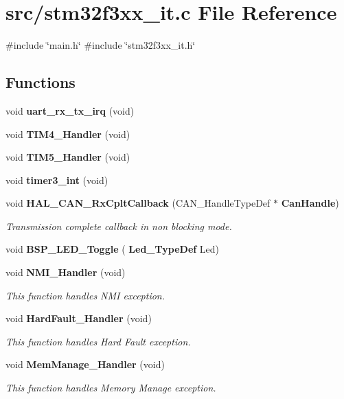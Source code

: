 \section{src/stm32f3xx\+\_\+it.c File Reference}
\label{stm32f3xx__it_8c}
{\ttfamily \#include \char`\"{}main.\+h\char`\"{}}\newline
{\ttfamily \#include \char`\"{}stm32f3xx\+\_\+it.\+h\char`\"{}}\newline
\subsection*{Functions}
\begin{DoxyCompactItemize}
\item 
void \textbf{ uart\+\_\+rx\+\_\+tx\+\_\+irq} (void)
\item 
void \textbf{ T\+I\+M4\+\_\+\+Handler} (void)
\item 
void \textbf{ T\+I\+M5\+\_\+\+Handler} (void)
\item 
void \textbf{ timer3\+\_\+int} (void)
\item 
void \textbf{ H\+A\+L\+\_\+\+C\+A\+N\+\_\+\+Rx\+Cplt\+Callback} (C\+A\+N\+\_\+\+Handle\+Type\+Def $\ast$\textbf{ Can\+Handle})
\begin{DoxyCompactList}\small\item\em Transmission complete callback in non blocking mode. \end{DoxyCompactList}\item 
void \textbf{ B\+S\+P\+\_\+\+L\+E\+D\+\_\+\+Toggle} (\textbf{ Led\+\_\+\+Type\+Def} Led)
\item 
void \textbf{ N\+M\+I\+\_\+\+Handler} (void)
\begin{DoxyCompactList}\small\item\em This function handles N\+MI exception. \end{DoxyCompactList}\item 
void \textbf{ Hard\+Fault\+\_\+\+Handler} (void)
\begin{DoxyCompactList}\small\item\em This function handles Hard Fault exception. \end{DoxyCompactList}\item 
void \textbf{ Mem\+Manage\+\_\+\+Handler} (void)
\begin{DoxyCompactList}\small\item\em This function handles Memory Manage exception. \end{DoxyCompactList}\item 

\end{DoxyCompactItemize}
